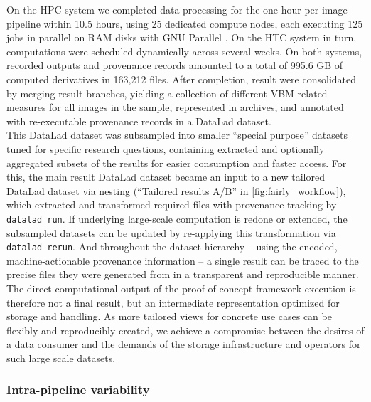 On the \gls{HPC} system we completed data processing for the one-hour-per-image pipeline within 10.5 hours, using 25 dedicated compute nodes, each executing 125 jobs in parallel on RAM disks with GNU Parallel \citep{tange2011gnu}.
On the \gls{HTC} system in turn, computations were scheduled dynamically across several weeks.
On both systems, recorded outputs and provenance records amounted to a total of 995.6 GB of computed derivatives in 163,212 files.
After completion, result were consolidated by merging result branches, yielding a collection of different VBM-related measures for all images in the sample, represented in archives, and annotated with re-executable provenance records in a DataLad dataset.\\
This DataLad dataset was subsampled into smaller ``special purpose'' datasets tuned for specific research questions, containing extracted and optionally aggregated subsets of the results for easier consumption and faster access.
For this, the main result DataLad dataset became an input to a new tailored DataLad dataset via nesting (``Tailored results A/B'' in \cref{fig:fairly_workflow}), which extracted and transformed required files with provenance tracking by \texttt{datalad run}.
If underlying large-scale computation is redone or extended, the subsampled datasets can be updated by re-applying this transformation via \texttt{datalad rerun}.
And throughout the dataset hierarchy -- using the encoded, machine-actionable provenance information -- a single result can be traced to the precise files they were generated from in a transparent and reproducible manner.
The direct computational output of the proof-of-concept framework execution is therefore not a final result, but an intermediate representation optimized for storage and handling.
As more tailored views for concrete use cases can be flexibly and reproducibly created, we achieve a compromise between the desires of a data consumer and the demands of the storage infrastructure and operators for such large scale datasets.

\subsubsection{Intra-pipeline variability}

